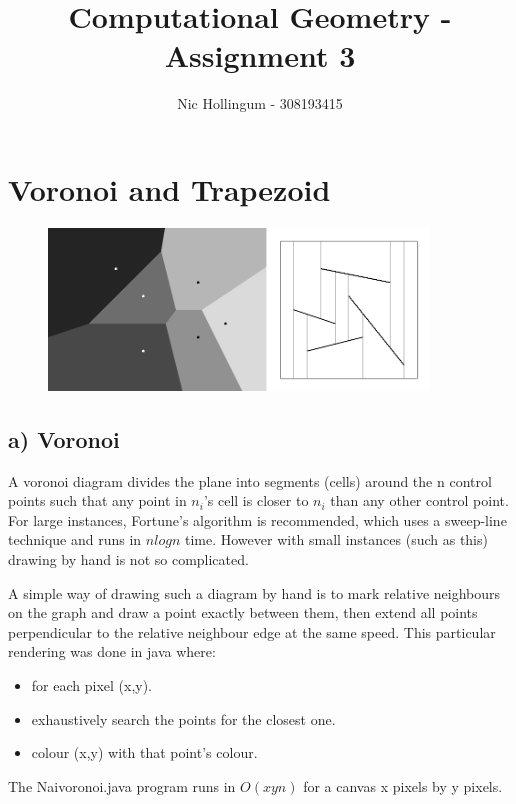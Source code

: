 \documentclass{article}
\author{Nic Hollingum - 308193415}
\title{Computational Geometry - Assignment 3}
\begin{document}
\maketitle

\section {Voronoi and Trapezoid}

\begin{figure}[htb]
\begin{center}
\leavevmode
\includegraphics[width=0.9\textwidth]{voronoi.png}
\end{center}
\label{fig:vortrap}
\end{figure}

\subsection{a) Voronoi}
A voronoi diagram divides the plane into segments (cells) around the n control points such that any point in $n_i$'s cell is closer to $n_i$ than any other control point.
For large instances, Fortune's algorithm is recommended, which uses a sweep-line technique and runs in $n log n$ time.
However with small instances (such as this) drawing by hand is not so complicated.

A simple way of drawing such a diagram by hand is to mark relative neighbours on the graph and draw a point exactly between them, then extend all points perpendicular to the relative neighbour edge at the same speed.
This particular rendering was done in java where:
\begin{itemize}
	\item for each pixel (x,y).
	\item exhaustively search the points for the closest one.
	\item colour (x,y) with that point's colour.
\end{itemize}
The Naivoronoi.java program runs in $O(xyn)$ for a canvas x pixels by y pixels.
\end{document}
